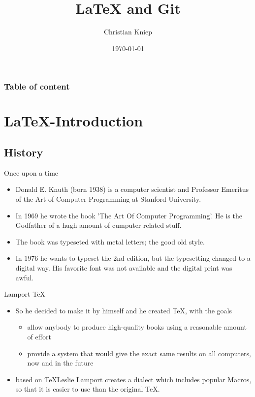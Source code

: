 \documentclass[handout]{beamer}
\author{Christian Kniep}
\begin{document}
\title{LaTeX and Git}  
\date[\today]{\today} 

\begin{frame}
	\titlepage
\end{frame} 

\begin{frame}
	\frametitle{Table of content}
	\tableofcontents
\end{frame} 


\section{LaTeX-Introduction} 
	\subsection{History}
		\begin{frame}{Once upon a time}
			\begin{itemize}
				\item<1-> Donald  E. Knuth (born 1938) is a computer scientist and Professor Emeritus of the Art of Computer Programming at Stanford University.
                \item<2-> In 1969 he wrote the book 'The Art Of Computer Programming'. He is the Godfather of a hugh amount of cumputer related stuff.
                \item<3-> The book was typeseted with metal letters; the good old style.
                \item<4-> In 1976 he wants to typeset the 2nd edition, but the typesetting changed to a digital way. His favorite font was not available and the digital print was awful.
            \end{itemize}
		\end{frame}
        \begin{frame}{Lamport TeX}
			\begin{itemize}
                \item<1-> So he decided to make it by himself and he created \TeX, with the goals
                \begin{itemize}
                    \item<2-> allow anybody to produce high-quality books using a reasonable amount of effort
                    \item<3-> provide a system that would give the exact same results on all computers, now and in the future
                \end{itemize}
				\item<4-> based on \TeX Leslie Lamport creates a dialect which includes popular Macros, so that it is easier to use than the original TeX.
            \end{itemize}
		\end{frame}
\end{document}
